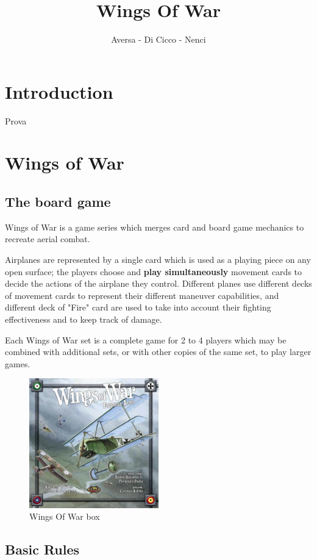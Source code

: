 \documentclass[12pt]{report}
\title{Wings Of War}
\author{Aversa - Di Cicco - Nenci}
\begin{document}
\maketitle
\tableofcontents
\chapter{Introduction}
Prova
\chapter{Wings of War}

\section{The board game}

Wings of War is a game series which merges card and board game mechanics to recreate aerial combat.

Airplanes are represented by a single card which is used as a playing piece on any open surface; the players choose and \textbf{play simultaneously} movement cards to decide the actions of the airplane they control. Different planes use different decks of movement cards to represent their different maneuver capabilities, and different deck of "Fire" card are used to take into account their fighting effectiveness and to keep track of damage.

Each Wings of War set is a complete game for 2 to 4 players which may be combined with additional sets, or with other copies of the same set, to play larger games.

\begin{figure}
  \centering
      \includegraphics[width=0.5\textwidth]{images/wow.jpg}
  \caption{Wings Of War box}
\end{figure}

\section{Basic Rules}
\end{document}

